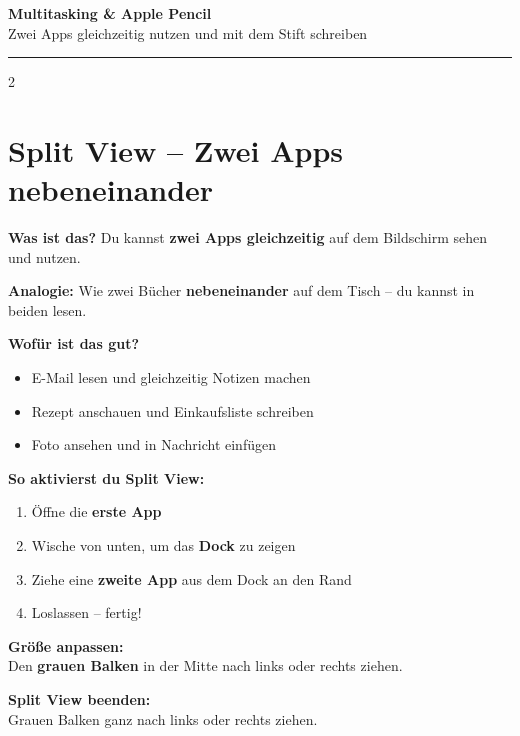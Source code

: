\documentclass[a4paper,landscape,8pt]{extarticle}
\begin{document}
\newpage


\begin{center}
{\LARGE\bfseries Multitasking \& Apple Pencil}\\[3pt]
{\normalsize Zwei Apps gleichzeitig nutzen und mit dem Stift schreiben}
\end{center}

\vspace{1mm}
\hrule
\vspace{2mm}

\begin{multicols}{2}

\section*{\textcolor{splitblue}{Split View -- Zwei Apps nebeneinander}}

\textbf{Was ist das?} Du kannst \textbf{zwei Apps gleichzeitig} auf dem Bildschirm sehen und nutzen.

\textbf{Analogie:} Wie zwei Bücher \textbf{nebeneinander} auf dem Tisch -- du kannst in beiden lesen.

\textbf{Wofür ist das gut?}
\begin{itemize}
\item E-Mail lesen und gleichzeitig Notizen machen
\item Rezept anschauen und Einkaufsliste schreiben
\item Foto ansehen und in Nachricht einfügen
\end{itemize}

\textbf{So aktivierst du Split View:}
\begin{enumerate}
\item Öffne die \textbf{erste App}
\item Wische von unten, um das \textbf{Dock} zu zeigen
\item Ziehe eine \textbf{zweite App} aus dem Dock an den Rand
\item Loslassen -- fertig!
\end{enumerate}

\textbf{Größe anpassen:}\\
Den \textbf{grauen Balken} in der Mitte nach links oder rechts ziehen.

\textbf{Split View beenden:}\\
Grauen Balken ganz nach links oder rechts ziehen.


\end{multicols}
\end{document}

